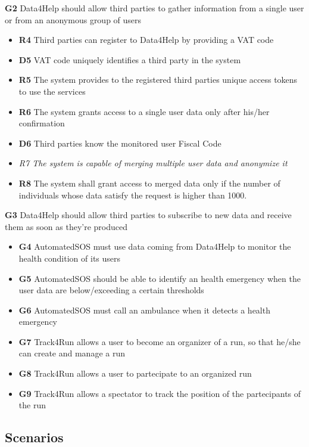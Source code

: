 \textbf{G2} Data4Help should allow third parties to gather information from a single user or from an anonymous group of users
\begin{itemize}
\item \textbf{R4} Third parties can register to Data4Help by providing a VAT code
\item \textbf{D5} VAT code uniquely identifies a third party in the system
\item \textbf{R5} The system provides to the registered third parties unique access tokens to use the services
\item \textbf{R6} The system grants access to a single user data only after his/her confirmation
\item \textbf{D6} Third parties know the monitored user Fiscal Code
\item \textit{R7 The system is capable of merging multiple user data and anonymize it}
\item \textbf{R8} The system shall grant access to merged data only if the number	of individuals	whose data satisfy the request is higher than	 1000.	
 	
  

\end{itemize}


\textbf{G3} Data4Help should allow third parties to subscribe to new data and receive them as soon as they're produced
\begin{itemize}
\item \textbf{G4} AutomatedSOS must use data coming from Data4Help to monitor the health condition of its users
\item \textbf{G5} AutomatedSOS should be able to identify an health emergency when the user data are below/exceeding a certain thresholds
\item \textbf{G6} AutomatedSOS must call an ambulance when it detects a health emergency
\item \textbf{G7} Track4Run allows a user to become an organizer of a run, so that he/she can create and manage a run
\item \textbf{G8} Track4Run allows a user to partecipate to an organized run
\item \textbf{G9} Track4Run allows a spectator to track the position of the partecipants of the run 

\end{itemize}


\subsection{Scenarios}
